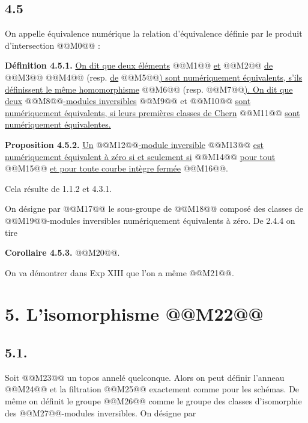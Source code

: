
\subsection*{4.5}
On
appelle équivalence numérique la relation d'équivalence définie par le produit d'intersection @@M0@@ :

\textbf{Définition 4.5.1.} \uline{On dit que deux éléments} @@M1@@ \uline{et} @@M2@@ \uline{de} @@M3@@ @@M4@@ (resp. \uline{de} @@M5@@\uline{) sont numériquement équivalents, s'ils définissent le même homomorphisme} @@M6@@ (resp. @@M7@@\uline{).
On dit que deux} @@M8@@\uline{-modules inversibles} @@M9@@ et @@M10@@ \uline{sont numériquement équivalents, si leurs premières classes de Chern} @@M11@@ \uline{sont numériquement équivalentes.}

\textbf{Proposition 4.5.2.} \uline{Un} @@M12@@\uline{-module inversible} @@M13@@ \uline{est numériquement équivalent à zéro si et seulement si}
@@M14@@
\uline{pour tout} @@M15@@ \uline{et pour toute courbe intègre fermée} @@M16@@.

Cela résulte de 1.1.2 et 4.3.1.

On désigne par @@M17@@ le sous-groupe de @@M18@@ composé des classes de @@M19@@-modules inversibles numériquement équivalents à zéro. De 2.4.4 on tire

\textbf{Corollaire 4.5.3.} @@M20@@.

On va démontrer dans Exp XIII que l'on a même @@M21@@.

\section*{5. L'isomorphisme @@M22@@}

\subsection*{5.1.}
Soit @@M23@@ un topos annelé quelconque. Alors on peut définir l'anneau @@M24@@ et la filtration @@M25@@ exactement comme pour les schémas. De même on définit le groupe @@M26@@ comme le groupe des classes d'isomorphie des @@M27@@-modules inversibles. On désigne par
